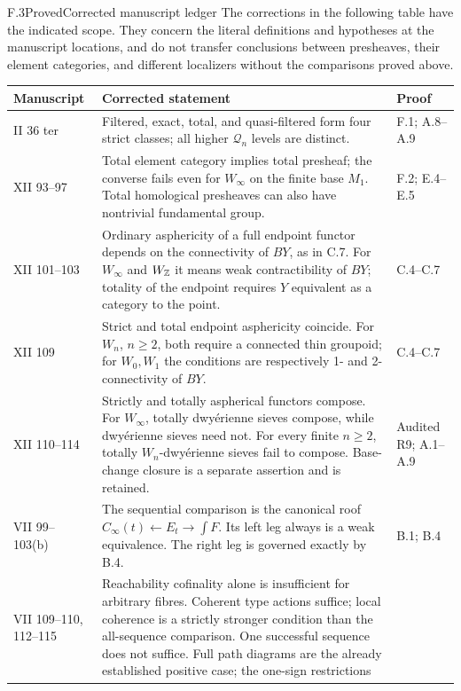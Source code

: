 \begin{claim}{F.3}{Proved}{Corrected manuscript ledger}
\label{F:manuscript-ledger}
The corrections in the following table have the indicated
scope. They concern the literal definitions and hypotheses at
the manuscript locations, and do not transfer conclusions
between presheaves, their element categories, and different
localizers without the comparisons proved above.
\end{claim}
\begin{center}
\small
\begin{longtable}{p{25mm}p{101mm}p{20mm}}
\toprule
Manuscript & Corrected statement & Proof\\
\midrule
\endhead
II 36 ter & Filtered, exact, total, and quasi-filtered form four
strict classes; all higher $\mathcal Q_n$ levels are distinct.
& F.1; A.8--A.9\\
XII 93--97 & Total element category implies total presheaf;
the converse fails even for $W_\infty$ on the finite base $M_1$.
Total homological presheaves can also have nontrivial fundamental group.
& F.2; E.4--E.5\\
XII 101--103 & Ordinary asphericity of a full endpoint functor
depends on the connectivity of $BY$, as in C.7. For $W_\infty$
and $W_{\mathbb Z}$ it means weak contractibility of $BY$; totality of
the endpoint requires $Y$ equivalent as a category to the point.
& C.4--C.7\\
XII 109 & Strict and total endpoint asphericity coincide. For
$W_n$, $n\geq2$, both require a connected thin groupoid; for
$W_0,W_1$ the conditions are respectively 1- and 2-connectivity of $BY$.
& C.4--C.7\\
XII 110--114 & Strictly and totally aspherical functors compose.
For $W_\infty$, totally dwy\'erienne sieves compose, while
dwy\'erienne sieves need not. For every finite $n\geq2$, totally
$W_n$-dwy\'erienne sieves fail to compose. Base-change closure
is a separate assertion and is retained.
& Audited R9; A.1--A.9\\
VII 99--103(b) & The sequential comparison is the canonical
roof $C_\infty(t)\leftarrow E_t\to\int F$. Its left leg always
is a weak equivalence. The right leg is governed exactly by B.4.
& B.1; B.4\\
VII 109--110,
112--115 & Reachability cofinality alone is insufficient for
arbitrary fibres. Coherent type actions suffice; local coherence
is a strictly stronger condition than the all-sequence comparison.
One successful sequence does not suffice. Full path diagrams are
the already established positive case; the one-sign restrictions

\end{longtable}
\end{center}
